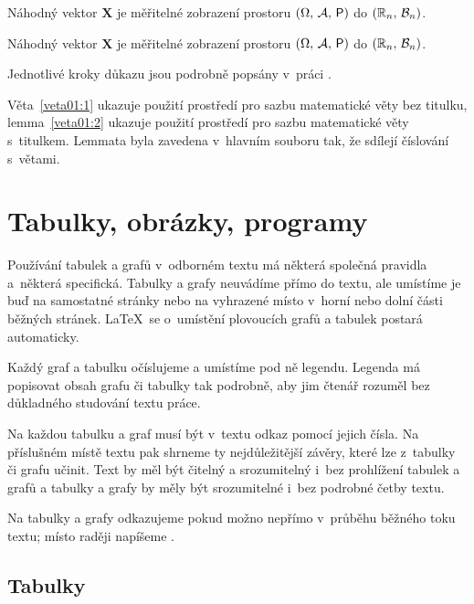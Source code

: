 \begin{veta}\label{veta01:1}
      Náhodný vektor $\bm X$ je měřitelné zobrazení prostoru
      $(\Omega,\,\mathcal{A},\,\operatorname{\textsf{P}})$ do $(\mathbb{R}_n,\,\mathcal{B}_n)$.
\end{veta}

\begin{lemma}\label{veta01:2}
      Náhodný vektor $\bm X$ je měřitelné zobrazení prostoru
      $(\Omega,\,\mathcal{A},\,\operatorname{\textsf{P}})$ do $(\mathbb{R}_n,\,\mathcal{B}_n)$.
\end{lemma}
\begin{dukaz}
      Jednotlivé kroky důkazu jsou podrobně popsány v~práci \citet[str.
            29]{Andel07}.
\end{dukaz}
Věta~\ref{veta01:1} ukazuje použití prostředí pro sazbu matematické
věty bez titulku, lemma~\ref{veta01:2} ukazuje použití prostředí pro
sazbu matematické věty s~titulkem. Lemmata byla zavedena v~hlavním
souboru tak, že sdílejí číslování s~větami.

\chapter{Tabulky, obrázky, programy}

Používání tabulek a grafů v~odborném textu má některá společná
pravidla a~některá specifická. Tabulky a grafy neuvádíme přímo do
textu, ale umístíme je buď na samostatné stránky nebo na vyhrazené
místo v~horní nebo dolní části běžných stránek. \LaTeX\ se o~umístění
plovoucích grafů a tabulek postará automaticky.

Každý graf a tabulku
očíslujeme a umístíme pod ně legendu. Legenda má popisovat obsah grafu
či tabulky tak podrobně, aby jim čtenář rozuměl bez důkladného
studování textu práce.

Na každou tabulku a graf musí být v~textu odkaz
pomocí jejich čísla. Na příslušném místě textu pak shrneme ty
nejdůležitější závěry, které lze z~tabulky či grafu učinit. Text by
měl být čitelný a srozumitelný i~bez prohlížení tabulek a grafů a
tabulky a grafy by měly být srozumitelné i~bez podrobné četby textu.

Na tabulky a grafy odkazujeme pokud možno nepřímo v~průběhu běžného
toku textu; místo \emph{} raději napíšeme
\emph{}.

\section{Tabulky}

